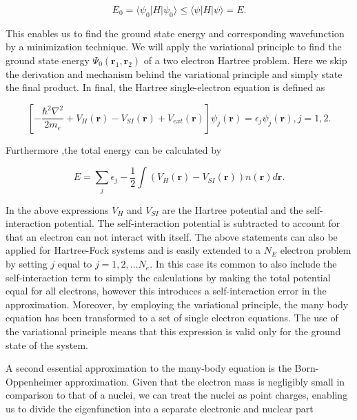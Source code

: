 \begin{equation}
    E_0 = \langle\psi_0|H|\psi_0\rangle \leq \langle\psi|H|\psi\rangle = E.
\end{equation}

This enables us to find the ground state energy and corresponding wavefunction by a minimization technique. We will apply the variational principle to find the ground state energy $\Psi_0(\boldsymbol{r}_1, \boldsymbol{r}_2)$ of a two electron Hartree problem. Here we skip the derivation and mechanism behind the variational principle and simply state the final product. In final, the Hartree single-electron equation is defined as

\begin{equation}
\left[ -\frac{\hbar^2\nabla^2}{2m_e} + V_H(\boldsymbol{r}) - V_{SI}(\boldsymbol{r}) + V_{ext}(\boldsymbol{r}) \right] \psi_j(\boldsymbol{r}) = \epsilon_j \psi_j(\boldsymbol{r}), j = 1, 2.
\end{equation}
 
\newpage
Furthermore ,the total energy can be calculated by
 
\begin{equation}
E = \sum_j \epsilon_j - \frac{1}{2} \int \left( V_H(\boldsymbol{r}) - V_{SI}(\boldsymbol{r}) \right) n(\boldsymbol{r})d\boldsymbol{r}.
\end{equation} 
 
In the above expressions $V_H$ and $V_{SI}$ are the Hartree potential and the self-interaction potential. The self-interaction potential is subtracted to account for that an electron can not interact with itself. The above statements can also be applied for Hartree-Fock systems and is easily extended to a $N_E$ electron problem by setting $j$ equal to $j = 1, 2, \dots N_e$. In this case its common to also include the self-interaction term to simply the calculations by making the total potential equal for all electrons, however this introduces a self-interaction error in the approximation. Moreover, by employing the variational principle, the many body equation has been transformed to a set of single electron equations. The use of the variational principle means that this expression is valid only for the ground state of the system. 

A second essential approximation to the many-body equation is the Born-Oppenheimer approximation. Given that the electron mass is negligibly small in comparison to that of a nuclei, we can treat the nuclei as point charges, enabling us to divide the eigenfunction into a separate electronic and nuclear part

